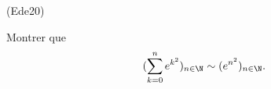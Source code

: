 \begin{tiny}(Ede20)\end{tiny} Montrer que
\[
(\sum_{k=0}^{n}e^{k^{2}})_{n\in \N}\sim (e^{n^{2}})_{n\in \N}.
\]

